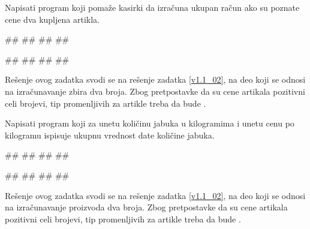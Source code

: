 \begin{Exercise}[label=p1_005]
Napisati program koji pomaže kasirki da izračuna ukupan račun ako su poznate cene dva kupljena artikla. 

\begin{miditest}
\begin{upotreba}{1}
#\naslovInt#
##
##
##
\end{upotreba}
\end{miditest}
\begin{miditest}
\begin{upotreba}{2}
#\naslovInt#
##
##
##
\end{upotreba}
\end{miditest}

\end{Exercise}
\begin{Answer}[ref=p1_005]

Rešenje ovog zadatka svodi se na rešenje zadatka \ref{v1.1_02}, na deo koji se odnosi na izračunavanje zbira dva broja. Zbog pretpostavke da su cene artikala pozitivni celi brojevi, tip promenljivih za artikle treba da bude .
\end{Answer}

\begin{Exercise}[label=p1_05]
Napisati program koji za unetu količinu jabuka u kilogramima i unetu
cenu po kilogramu ispisuje ukupnu vrednost date količine jabuka.  

\begin{miditest}
\begin{upotreba}{1}
#\naslovInt#
##
##
##
\end{upotreba}
\end{miditest}
\begin{miditest}
\begin{upotreba}{1}
#\naslovInt#
##
##
##
\end{upotreba}
\end{miditest}
\end{Exercise}
\begin{Answer}[ref=p1_05]

Rešenje ovog zadatka svodi se na rešenje zadatka \ref{v1.1_02}, na deo koji se odnosi na izračunavanje proizvoda dva broja. Zbog pretpostavke da su cene artikala pozitivni celi brojevi, tip promenljivih za artikle treba da bude .
\end{Answer}


